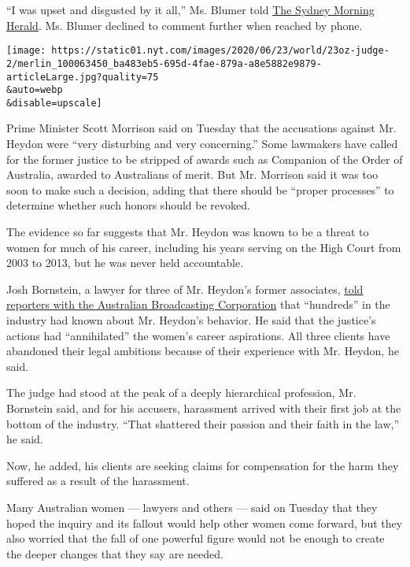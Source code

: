 ``I was upset and disgusted by it all,'' Ms. Blumer told
\href{https://www.smh.com.au/politics/federal/the-judge-s-hands-became-very-busy-under-the-table-lawyer-says-heydon-groped-her-20200622-p554zg.html}{The
Sydney Morning Herald}. Ms. Blumer declined to comment further when
reached by phone.

\texttt{[image: https://static01.nyt.com/images/2020/06/23/world/23oz-judge-2/merlin\_100063450\_ba483eb5-695d-4fae-879a-a8e5882e9879-articleLarge.jpg?quality=75\\\&auto=webp\\\&disable=upscale]}

Prime Minister Scott Morrison said on Tuesday that the accusations
against Mr. Heydon were ``very disturbing and very concerning.'' Some
lawmakers have called for the former justice to be stripped of awards
such as Companion of the Order of Australia, awarded to Australians of
merit. But Mr. Morrison said it was too soon to make such a decision,
adding that there should be ``proper processes'' to determine whether
such honors should be revoked.

The evidence so far suggests that Mr. Heydon was known to be a threat to
women for much of his career, including his years serving on the High
Court from 2003 to 2013, but he was never held accountable.

Josh Bornstein, a lawyer for three of Mr. Heydon's former associates,
\href{https://www.abc.net.au/radio/melbourne/programs/mornings/dyson-heydon-shattered-associates-career-aspirations/12383230}{told
reporters with the Australian Broadcasting Corporation} that
``hundreds'' in the industry had known about Mr. Heydon's behavior. He
said that the justice's actions had ``annihilated'' the women's career
aspirations. All three clients have abandoned their legal ambitions
because of their experience with Mr. Heydon, he said.

The judge had stood at the peak of a deeply hierarchical profession, Mr.
Bornstein said, and for his accusers, harassment arrived with their
first job at the bottom of the industry. ``That shattered their passion
and their faith in the law,'' he said.

Now, he added, his clients are seeking claims for compensation for the
harm they suffered as a result of the harassment.

Many Australian women --- lawyers and others --- said on Tuesday that
they hoped the inquiry and its fallout would help other women come
forward, but they also worried that the fall of one powerful figure
would not be enough to create the deeper changes that they say are
needed.

